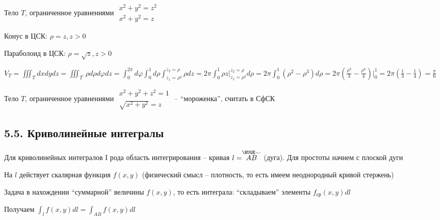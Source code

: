 \documentclass[12pt]{article}
\begin{document}
    \Ex Тело $T$, ограниченное уравнениями $\begin{matrix}x^2 + y^2 = z^2 \\ x^2 + y^2 = z\end{matrix}$

    Конус в ЦСК: $\rho = z, z > 0$

    Параболоид в ЦСК: $\rho = \sqrt{z}, z > 0$

    $V_T = \iiint_T dxdydz = \iiint_{T^\prime}\rho d\rho d\varphi dz = \int_0^{2\pi} d\varphi \int_0^1 d \rho \int_{z_1 = \rho^2}^{z_2=\rho} \rho dz =
    2\pi \int_0^1 \rho z \Big|_{z_1 = \rho^2}^{z_2=\rho} d\rho = 2\pi \int_0^1 (\rho^2 - \rho^3) d\rho =
    2\pi \left(\frac{\rho^3}{3} - \frac{\rho^4}{4}\right) \Big|_0^1 = 2\pi \left(\frac{1}{3} - \frac{1}{4}\right) = \frac{\pi}{6}$

    \Lab Тело $T$, ограниченное уравнениями $\begin{matrix}x^2 + y^2 + z^2 = 1 \\ \sqrt{x^2 + y^2} = z\end{matrix}$ -- \enquote{мороженка}, считать в СфСК


    \subsection{5.5. Криволинейные интегралы}

    \hypertarget{curvilinearintegraloffirstkind}{}

    Для криволинейных интегралов I рода область интегрирования -- кривая $l = \stackrel{\HUGE\smile}{AB}$ (дуга). Для простоты начнем с плоской дуги

    На $l$ действует скалярная функция $f(x, y)$ (физический смысл -- плотность, то есть имеем неоднородный кривой стержень)

    Задача в нахождении \enquote{суммарной} величины $f(x, y)$, то есть интеграла: \enquote{складываем} элементы $f_{\text{ср}}(x, y) dl$

    Получаем $\int_l f(x, y)dl = \int_{AB} f(x, y)dl$
\end{document}
